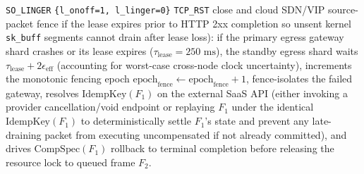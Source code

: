 \documentclass[conference,10pt]{IEEEtran}
\begin{document}
\texttt{SO\_LINGER} \texttt{\{l\_onoff=1, l\_linger=0\}} \texttt{TCP\_RST} close and cloud SDN/VIP source-packet fence if the lease expires prior to HTTP 2xx completion so unsent kernel \texttt{sk\_buff} segments cannot drain after lease loss): if the primary egress gateway shard crashes or its lease expires ($\tau_{\text{lease}} = 250\text{ ms}$), the standby egress shard waits $\tau_{\text{lease}} + 2\epsilon_{\text{eff}}$ (accounting for worst-case cross-node clock uncertainty), increments the monotonic fencing epoch $\text{epoch}_{\text{fence}} \leftarrow \text{epoch}_{\text{fence}} + 1$, fence-isolates the failed gateway, resolves $\text{IdempKey}(F_1)$ on the external SaaS API (either invoking a provider cancellation/void endpoint or replaying $F_1$ under the identical $\text{IdempKey}(F_1)$ to deterministically settle $F_1$'s state and prevent any late-draining packet from executing uncompensated if not already committed), and drives $\text{CompSpec}(F_1)$ rollback to terminal completion before releasing the resource lock to queued frame $F_2$.
\end{document}
